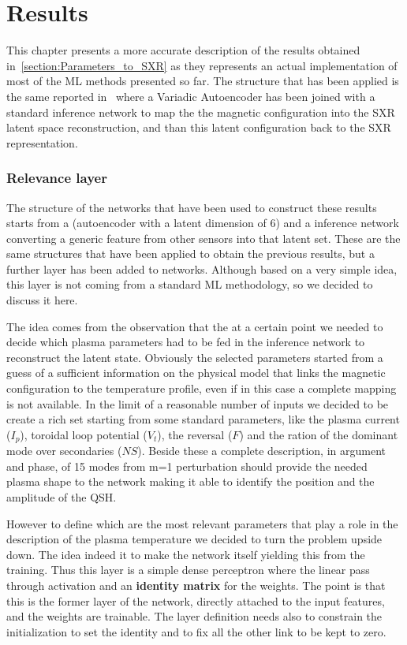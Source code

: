 \chapter{Results}
\label{section:7_Results}

This chapter presents a more accurate description of the results obtained in~\cref{section:Parameters_to_SXR} as they represents an actual implementation of most of the ML methods presented so far.
The structure that has been applied is the same reported in~\Figure{\ref{fig:SXR_from_param}} where a Variadic Autoencoder has been joined with a standard inference network to map the the magnetic configuration into the SXR latent space reconstruction, and than this latent configuration back to the SXR representation.

\subsection{Relevance layer}

The structure of the networks that have been used to construct these results starts from a  (autoencoder with a latent dimension of 6) and a inference network converting a generic feature from other sensors into that latent set.
These are the same structures that have been applied to obtain the previous results, but a further layer has been added to networks. Although based on a very simple idea, this layer is not coming from a standard ML methodology, so we decided to discuss it here. 

The idea comes from the observation that the at a certain point we needed to decide which plasma parameters had to be fed in the inference network to reconstruct the latent state. Obviously the selected parameters started from a guess of a sufficient information on the physical model that links the magnetic configuration to the temperature profile, even if in this case a complete mapping is not available.
In the limit of a reasonable number of inputs we decided to be create a rich set starting from some standard parameters, like the plasma current ($I_p$), toroidal loop potential ($V_t$), the reversal ($F$) and the ration of the dominant mode over secondaries ($NS$). Beside these a complete description, in argument and phase, of 15 modes from m=1 perturbation should provide the needed plasma shape to the network making it able to identify the position and the amplitude of the QSH.

However to define which are the most relevant parameters that play a role in the description of the plasma temperature we decided to turn the problem upside down. The idea indeed it to make the network itself yielding this from the training. Thus this layer is a simple dense perceptron where the linear pass through activation and an \textbf{identity matrix} for the weights. The point is that this is the former layer of the network, directly attached to the input features, and the weights are trainable. The layer definition needs also to constrain the initialization to set the identity and to fix all the other link to be kept to zero. 

